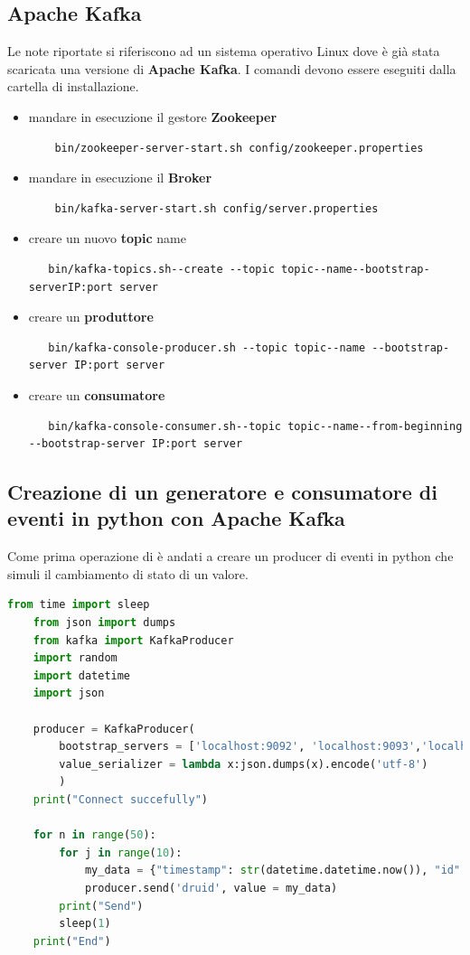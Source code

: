\documentclass{article}
\begin{document}
\subsection{Apache Kafka}
Le note riportate si riferiscono ad un sistema operativo Linux dove è già stata scaricata una versione di \textbf{Apache Kafka}. I comandi devono essere eseguiti dalla cartella di installazione.
\begin{itemize}
    \item mandare in esecuzione il gestore \textbf{Zookeeper}
    \begin{lstlisting}
    bin/zookeeper-server-start.sh config/zookeeper.properties\end{lstlisting}
    \item mandare in esecuzione il \textbf{Broker}
    \begin{lstlisting}
    bin/kafka-server-start.sh config/server.properties\end{lstlisting}
    \item creare un nuovo \textbf{topic} name
   \noindent \begin{lstlisting}
   bin/kafka-topics.sh--create --topic topic--name--bootstrap-serverIP:port server \end{lstlisting}
   \item creare un \textbf{produttore} 
   \begin{lstlisting}
   bin/kafka-console-producer.sh --topic topic--name --bootstrap-server IP:port server \end{lstlisting}
   \item creare un \textbf{consumatore}
   \begin{lstlisting}
   bin/kafka-console-consumer.sh--topic topic--name--from-beginning --bootstrap-server IP:port server
   \end{lstlisting}

\end{itemize}
\pagebreak
\subsection{Creazione di un generatore e consumatore di eventi in python con Apache Kafka}
Come prima operazione di è andati a creare un producer di eventi in python che simuli il cambiamento di stato di un valore.
\begin{lstlisting}[language=Python]
    from time import sleep  
    from json import dumps  
    from kafka import KafkaProducer  
    import random
    import datetime
    import json
    
    producer = KafkaProducer(  
        bootstrap_servers = ['localhost:9092', 'localhost:9093','localhost:9094'],  
        value_serializer = lambda x:json.dumps(x).encode('utf-8')  
        )  
    print("Connect succefully") 
    
    for n in range(50):  
        for j in range(10):
            my_data = {"timestamp": str(datetime.datetime.now()), "id" : str(random.randint(0,999)),"value": random.randint(0,1)} 
            producer.send('druid', value = my_data) 
        print("Send")
        sleep(1) 
    print("End")
\end{lstlisting}
\end{document}
